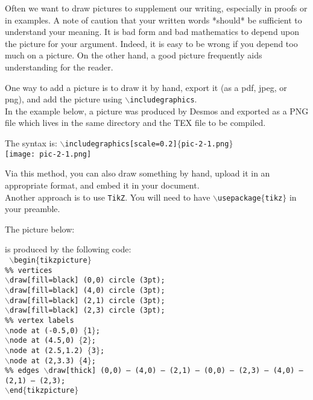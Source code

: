 \documentclass[12pt]{article}
\begin{document}
Often we want to draw pictures to supplement our writing, especially in proofs or in examples. A note of caution that your written words *should* be sufficient to understand your meaning. It is bad form and bad mathematics to depend upon the picture for your argument. Indeed, it is easy to be wrong if you depend too much on a picture. On the other hand, a good picture frequently aids understanding for the reader.

One way to add a picture is to draw it by hand, export it (as a pdf, jpeg, or png), and add the picture using \texttt{$\backslash$includegraphics}. \\

In the example below, a picture was produced by Desmos and exported as a PNG file which lives in the same directory and the TEX file to be compiled. 

The syntax is: \texttt{$\backslash$includegraphics[scale=0.2]$\{$pic-2-1.png$\}$}\\

\texttt{[image: pic-2-1.png]}

Via this method, you can also draw something by hand, upload it in an appropriate format, and embed it in your document. \\

Another approach is to use \texttt{TikZ}. You will need to have \texttt{$\backslash$usepackage$\{$tikz$\}$} in your preamble.

The picture below: 




is produced by the following code:\\

\texttt{
$\backslash$begin$\{$tikzpicture$\}$\\
\%\% vertices\\
$\backslash$draw[fill=black] (0,0) circle (3pt);\\
$\backslash$draw[fill=black] (4,0) circle (3pt);\\
$\backslash$draw[fill=black] (2,1) circle (3pt);\\
$\backslash$draw[fill=black] (2,3) circle (3pt);\\
\%\% vertex labels\\
$\backslash$node at (-0.5,0) $\{$1$\}$;\\
$\backslash$node at (4.5,0) $\{$2$\}$;\\
$\backslash$node at (2.5,1.2) $\{$3$\}$;\\
$\backslash$node at (2,3.3) $\{$4$\}$;\\
\%\% edges
$\backslash$draw[thick] (0,0) -- (4,0) -- (2,1) -- (0,0) -- (2,3) -- (4,0) -- (2,1) -- (2,3);\\
$\backslash$end$\{$tikzpicture$\}$
}

 
\end{document}
